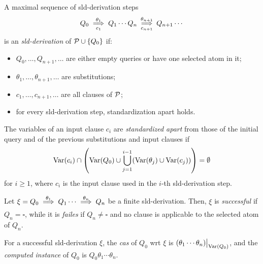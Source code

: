 \begin{dfn}
    A maximal sequence of \gls{sld}-derivation steps
    \begin{equation*}
        Q_0 \underset{c_1}{\overset{\theta_1}{\implies}} Q_1 \dotsb Q_n
        \underset{c_{n+1}}{\overset{\theta_{n+1}}{\implies}} Q_{n+1} \dotsb
    \end{equation*}
    is an \emph{\gls{sld}-derivation} of \(\mathcal{P} \cup \lbrace Q_0 \rbrace\) if:
    \begin{itemize}
        \item \(Q_0,\dotsc,Q_{n+1},\dotsc\) are either empty queries or have one selected atom in it;
        \item \(\theta_1,\dotsc,\theta_{n+1},\dotsc\) are substitutions;
        \item \(c_1,\dotsc,c_{n+1},\dotsc\) are all clauses of \(\mathcal{P}\);
        \item for every \gls{sld}-derivation step, standardization apart holds.
    \end{itemize}
\end{dfn}

\begin{dfn}
    The variables of an input clause \(c_i\) are \emph{standardized apart} from those of the initial query and of the previous substitutions and input clauses if
    \begin{equation*}
        \operatorname{Var}(c_i) \cap
        \left(\operatorname{Var}(Q_0) \cup \bigcup_{j=1}^{i-1}(\operatorname{Var}(\theta_j) \cup \operatorname{Var}(c_j))\right) = \emptyset
    \end{equation*}
    for \(i \ge 1\), where \(c_i\) is the input clause used in the \(i\)-th \gls{sld}-derivation step.
\end{dfn}

\begin{dfn}
    Let \(\xi = Q_0 \underset{}{\overset{\theta_1}{\implies}} Q_1 \dotsb \underset{}{\overset{\theta_n}{\implies}} Q_n\) be a finite \gls{sld}-derivation.
    Then, \(\xi\) is \emph{successful} if \(Q_n = \square\), while it is \emph{failes} if \(Q_n \ne \square\) and no clause is applicable to the selected atom of \(Q_n\).

    For a successful \gls{sld}-derivation \(\xi\), the \emph{\gls{cas}} of \(Q_0\) wrt \(\xi\) is \(\restr{(\theta_1\dotsb\theta_n)}{\Var(Q_0)}\), and the \emph{computed instance} of \(Q_0\) is \(Q_0\theta_1\dotsb\theta_n\).
\end{dfn}

